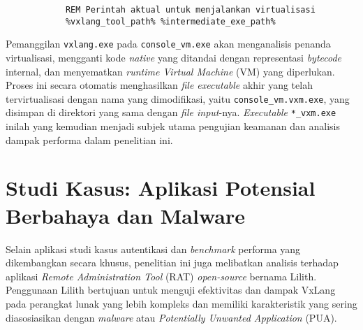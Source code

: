 \begin{enumerate}
\begin{itemize}
\begin{listing}[H]
\begin{verbatim}
            REM Perintah aktual untuk menjalankan virtualisasi
            %vxlang_tool_path% %intermediate_exe_path%
            \end{verbatim}
            \label{lst:virtualize_bat_example_bab4}
            \end{listing}
        Pemanggilan \texttt{vxlang.exe} pada \texttt{console\_vm.exe} akan menganalisis penanda virtualisasi, mengganti kode \textit{native} yang ditandai dengan representasi \textit{bytecode} internal, dan menyematkan \textit{runtime Virtual Machine} (VM) yang diperlukan. Proses ini secara otomatis menghasilkan \textit{file executable} akhir yang telah tervirtualisasi dengan nama yang dimodifikasi, yaitu \texttt{console\_vm.vxm.exe}, yang disimpan di direktori yang sama dengan \textit{file input}-nya. \textit{Executable} \texttt{*\_vxm.exe} inilah yang kemudian menjadi subjek utama pengujian keamanan dan analisis dampak performa dalam penelitian ini.
    \end{itemize}
\end{enumerate}

\section{Studi Kasus: Aplikasi Potensial Berbahaya dan Malware}
\label{sec:implementasi_lilith_dan_malware} 
Selain aplikasi studi kasus autentikasi dan \textit{benchmark} performa yang dikembangkan secara khusus, penelitian ini juga melibatkan analisis terhadap aplikasi \textit{Remote Administration Tool} (RAT) \textit{open-source} bernama Lilith. Penggunaan Lilith bertujuan untuk menguji efektivitas dan dampak VxLang pada perangkat lunak yang lebih kompleks dan memiliki karakteristik yang sering diasosiasikan dengan \textit{malware} atau \textit{Potentially Unwanted Application} (PUA).

